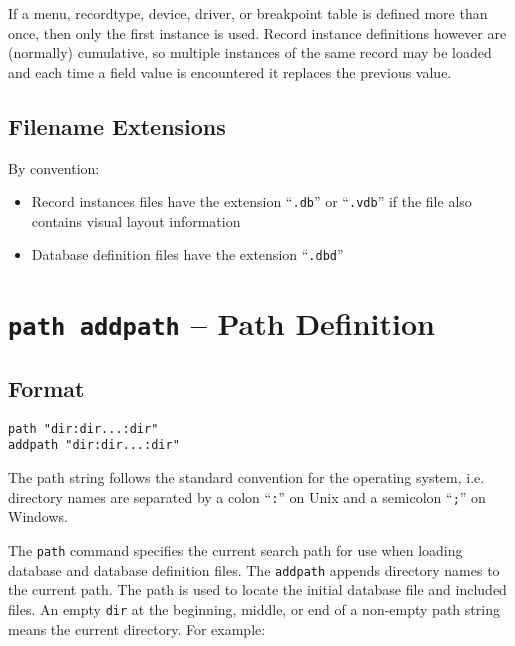 If a menu, recordtype, device, driver, or breakpoint table is defined more than once, then only the first instance is used. 
Record instance definitions however are (normally) cumulative, so multiple instances of the same record may be loaded 
and each time a field value is encountered it replaces the previous value.

\subsection{Filename Extensions}

By convention:

\begin{itemize}
\item Record instances files have the extension ``\verb|.db|'' or ``\verb|.vdb|'' if the file also contains visual layout information

\item Database definition files have the extension ``\verb|.dbd|''

\end{itemize}

\section{\texttt{path addpath} -- Path Definition}

\subsection{Format}

\begin{verbatim}
path "dir:dir...:dir"
addpath "dir:dir...:dir"
\end{verbatim}

The path string follows the standard convention for the operating system, i.e. directory names are separated by a colon ``\verb|:|'' on Unix
and a semicolon ``\verb|;|'' on Windows.

The \verb|path| command specifies the current search path for use when loading database and database definition files.
The \verb|addpath| appends directory names to the current path.
The path is used to locate the initial database file and included files.
An empty \verb|dir| at the beginning, middle, or end of a non-empty path string means the current directory.
For example:

